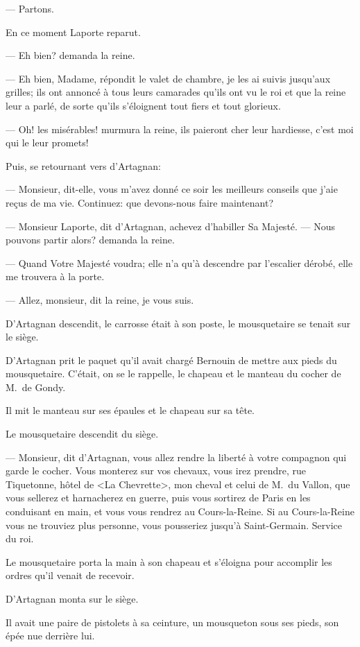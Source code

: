 — Partons.

En ce moment Laporte reparut.

— Eh bien? demanda la reine.

— Eh bien, Madame, répondit le valet de chambre, je les ai suivis jusqu'aux grilles; ils ont annoncé à tous leurs camarades qu'ils ont vu le roi et que la reine leur a parlé, de sorte qu'ils s'éloignent tout fiers et tout glorieux.

— Oh! les misérables! murmura la reine, ils paieront cher leur hardiesse, c'est moi qui le leur promets!

Puis, se retournant vers d'Artagnan:

— Monsieur, dit-elle, vous m'avez donné ce soir les meilleurs conseils que j'aie reçus de ma vie. Continuez: que devons-nous faire maintenant?

— Monsieur Laporte, dit d'Artagnan, achevez d'habiller Sa Majesté.
— Nous pouvons partir alors? demanda la reine.

— Quand Votre Majesté voudra; elle n'a qu'à descendre par l'escalier dérobé, elle me trouvera à la porte.

— Allez, monsieur, dit la reine, je vous suis.

D'Artagnan descendit, le carrosse était à son poste, le mousquetaire se tenait sur le siège.

D'Artagnan prit le paquet qu'il avait chargé Bernouin de mettre aux pieds du mousquetaire. C'était, on se le rappelle, le chapeau et le manteau du cocher de M.~de Gondy.

Il mit le manteau sur ses épaules et le chapeau sur sa tête.

Le mousquetaire descendit du siège.

— Monsieur, dit d'Artagnan, vous allez rendre la liberté à votre compagnon qui garde le cocher. Vous monterez sur vos chevaux, vous irez prendre, rue Tiquetonne, hôtel de <La Chevrette>, mon cheval et celui de M.~du Vallon, que vous sellerez et harnacherez en guerre, puis vous sortirez de Paris en les conduisant en main, et vous vous rendrez au Cours-la-Reine. Si au Cours-la-Reine vous ne trouviez plus personne, vous pousseriez jusqu'à Saint-Germain. Service du roi.

Le mousquetaire porta la main à son chapeau et s'éloigna pour accomplir les ordres qu'il venait de recevoir.

D'Artagnan monta sur le siège.

Il avait une paire de pistolets à sa ceinture, un mousqueton sous ses pieds, son épée nue derrière lui.

